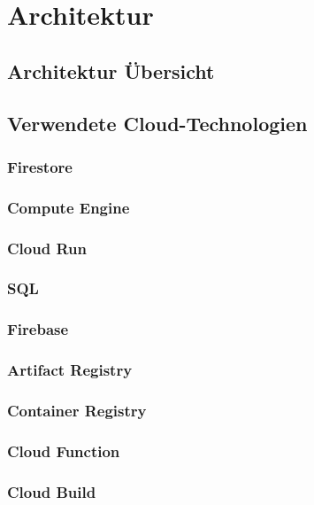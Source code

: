\chapter{Architektur}
\label{cha:architektur}





\section{Architektur Übersicht}
\blindtext

\section{Verwendete Cloud-Technologien}
\subsection{Firestore}
\blindtext
\subsection{Compute Engine}
\blindtext
\subsection{Cloud Run}
\blindtext
\subsection{SQL}
\blindtext
\subsection{Firebase}
\blindtext
\subsection{Artifact Registry}
\blindtext
\subsection{Container Registry}
\blindtext
\subsection{Cloud Function}
\blindtext
\subsection{Cloud Build}
\blindtext
